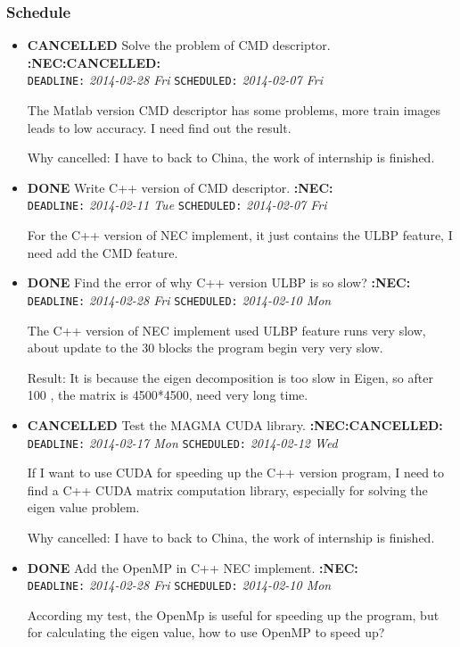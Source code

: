 \documentclass[CJK]{cctart}
\begin{document}
\subsubsection{Schedule}
\label{sec-1-1-4}
\begin{itemize}

\item \textbf{CANCELLED} Solve the problem of CMD descriptor. \textbf{:NEC:CANCELLED:}\\
\label{sec-1-1-4-1}%
\texttt{DEADLINE:} \textit{2014-02-28 Fri} \texttt{SCHEDULED:} \textit{2014-02-07 Fri}

The Matlab version CMD descriptor has some problems, more train
images leads to low accuracy. I need find out the result.

Why cancelled: I have to back to China, the work of internship is finished.


\item \textbf{DONE} Write C++ version of CMD descriptor. \textbf{:NEC:}\\
\label{sec-1-1-4-2}%
\texttt{DEADLINE:} \textit{2014-02-11 Tue} \texttt{SCHEDULED:} \textit{2014-02-07 Fri}

For the C++ version of NEC implement, it just contains the ULBP
feature, I need add the CMD feature.


\item \textbf{DONE} Find the error of why C++ version ULBP is so slow? \textbf{:NEC:}\\
\label{sec-1-1-4-3}%
\texttt{DEADLINE:} \textit{2014-02-28 Fri} \texttt{SCHEDULED:} \textit{2014-02-10 Mon}

The C++ version of NEC implement used ULBP feature runs very slow,
about update to the 30 blocks the program begin very very slow.

Result: It is because the eigen decomposition is too slow in Eigen,
so after 100 , the matrix is 4500*4500, need very long time.


\item \textbf{CANCELLED} Test the MAGMA CUDA library. \textbf{:NEC:CANCELLED:}\\
\label{sec-1-1-4-4}%
\texttt{DEADLINE:} \textit{2014-02-17 Mon} \texttt{SCHEDULED:} \textit{2014-02-12 Wed}

If I want to use CUDA for speeding up the C++ version program, I need
to find a C++ CUDA matrix computation library, especially for solving
the eigen value problem.

Why cancelled: I have to back to China, the work of internship is finished.


\item \textbf{DONE} Add the OpenMP in C++ NEC implement. \textbf{:NEC:}\\
\label{sec-1-1-4-5}%
\texttt{DEADLINE:} \textit{2014-02-28 Fri} \texttt{SCHEDULED:} \textit{2014-02-10 Mon}

According my test, the OpenMp is useful for speeding up the program,
but for calculating the eigen value, how to use OpenMP to speed up?

\end{itemize} %
\end{document}
